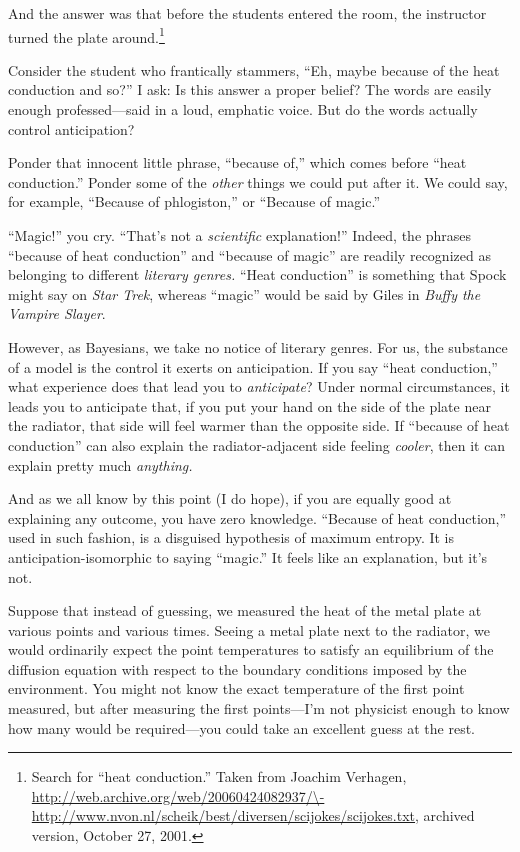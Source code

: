{
 And the answer was that before the students entered the room, the
instructor turned the plate around.\footnote{Search for ``heat
conduction.'' Taken from Joachim Verhagen,
\url{http://web.archive.org/web/20060424082937/\-http://www.nvon.nl/scheik/best/diversen/scijokes/scijokes.txt},
archived version, October 27, 2001.
}
}

{
 Consider the student who frantically stammers,
``Eh, maybe because of the heat conduction and
so?'' I ask: Is this answer a proper belief? The
words are easily enough professed---said in a loud, emphatic voice. But
do the words actually control anticipation?}

{
 Ponder that innocent little phrase, ``because
of,'' which comes before ``heat
conduction.'' Ponder some of the \textit{other}
things we could put after it. We could say, for example,
``Because of phlogiston,'' or
``Because of magic.''}

{
 ``Magic!'' you cry.
``That's not a \textit{scientific}
explanation!'' Indeed, the phrases
``because of heat conduction'' and
``because of magic'' are readily
recognized as belonging to different \textit{literary genres.}
``Heat conduction'' is something
that Spock might say on \textit{Star Trek}, whereas
``magic'' would be said by Giles in
\textit{Buffy the Vampire Slayer}.}

{
 However, as Bayesians, we take no notice of literary genres. For
us, the substance of a model is the control it exerts on anticipation.
If you say ``heat conduction,'' what
experience does that lead you to \textit{anticipate}? Under normal
circumstances, it leads you to anticipate that, if you put your hand on
the side of the plate near the radiator, that side will feel warmer
than the opposite side. If ``because of heat
conduction'' can also explain the radiator-adjacent
side feeling \textit{cooler}, then it can explain pretty much
\textit{anything.}}

{
 And as we all know by this point (I do hope), if you are equally
good at explaining any outcome, you have zero knowledge.
``Because of heat conduction,'' used
in such fashion, is a disguised hypothesis of maximum entropy. It is
anticipation-isomorphic to saying
``magic.'' It feels like an
explanation, but it's not.}

{
 Suppose that instead of guessing, we measured the heat of the
metal plate at various points and various times. Seeing a metal plate
next to the radiator, we would ordinarily expect the point temperatures
to satisfy an equilibrium of the diffusion equation with respect to the
boundary conditions imposed by the environment. You might not know the
exact temperature of the first point measured, but after measuring the
first points---I'm not physicist enough to know how
many would be required---you could take an excellent guess at the
rest.}

